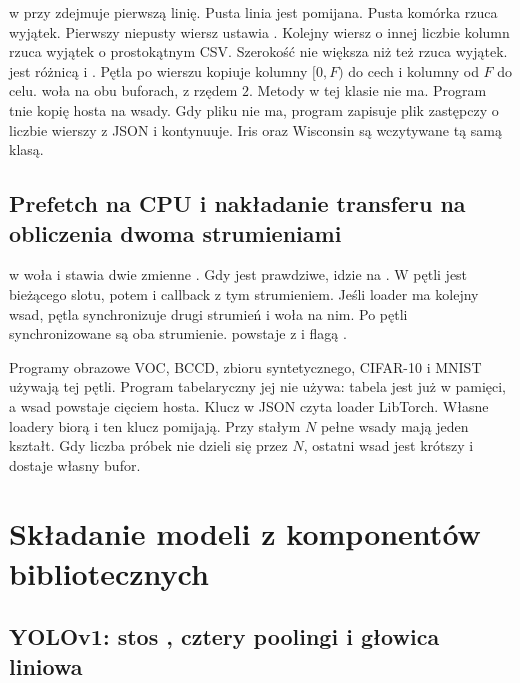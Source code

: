  w  przy  zdejmuje pierwszą linię. Pusta linia jest pomijana. Pusta komórka rzuca wyjątek. Pierwszy niepusty wiersz ustawia . Kolejny wiersz o innej liczbie kolumn rzuca wyjątek o prostokątnym CSV. Szerokość nie większa niż  też rzuca wyjątek.  jest różnicą  i . Pętla po wierszu kopiuje kolumny \([0, F)\) do cech i kolumny od \(F\) do celu.  woła  na obu buforach, z rzędem \(2\). Metody  w tej klasie nie ma. Program tnie kopię hosta na wsady. Gdy pliku nie ma, program zapisuje plik zastępczy o liczbie wierszy z JSON i kontynuuje. Iris oraz Wisconsin są wczytywane tą samą klasą.

\subsection{Prefetch na CPU i nakładanie transferu na obliczenia dwoma strumieniami}

 w  woła  i stawia dwie zmienne . Gdy  jest prawdziwe,  idzie na . W pętli jest  bieżącego slotu, potem  i callback  z tym strumieniem. Jeśli loader ma kolejny wsad, pętla synchronizuje drugi strumień i woła  na nim. Po pętli synchronizowane są oba strumienie.  powstaje z  i flagą .

Programy obrazowe VOC, BCCD, zbioru syntetycznego, CIFAR-10 i MNIST używają tej pętli. Program tabelaryczny jej nie używa: tabela jest już w pamięci, a wsad powstaje cięciem hosta. Klucz  w JSON czyta loader LibTorch. Własne loadery biorą  i ten klucz pomijają. Przy stałym \(N\) pełne wsady mają jeden kształt. Gdy liczba próbek nie dzieli się przez \(N\), ostatni wsad jest krótszy i dostaje własny bufor.

\section{Składanie modeli z komponentów bibliotecznych}

\subsection{YOLOv1: stos , cztery poolingi i głowica liniowa}

